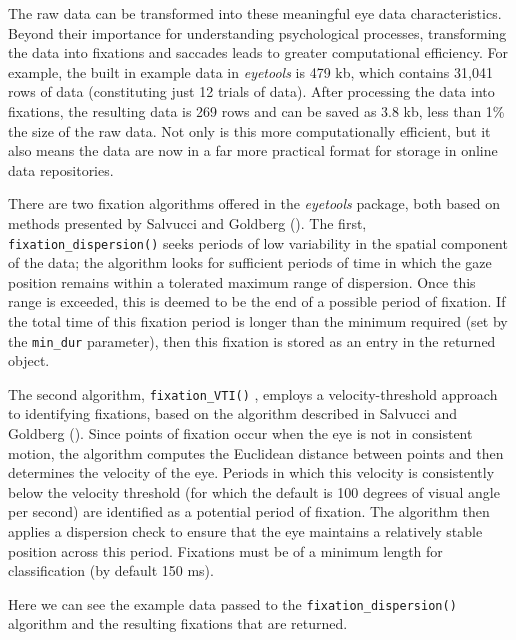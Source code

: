 \documentclass[
  man,
  floatsintext,
  longtable,
  nolmodern,
  notxfonts,
  notimes,
  colorlinks=true,linkcolor=blue,citecolor=blue,urlcolor=blue]{apa7}
\begin{document}
The raw data can be transformed into these meaningful eye data
characteristics. Beyond their importance for understanding psychological
processes, transforming the data into fixations and saccades leads to
greater computational efficiency. For example, the built in example data
in \emph{eyetools} is 479 kb, which contains 31,041 rows of data
(constituting just 12 trials of data). After processing the data into
fixations, the resulting data is 269 rows and can be saved as 3.8 kb,
less than 1\% the size of the raw data. Not only is this more
computationally efficient, but it also means the data are now in a far
more practical format for storage in online data repositories.

There are two fixation algorithms offered in the \emph{eyetools}
package, both based on methods presented by Salvucci and Goldberg
(). The first,
\texttt{fixation\_dispersion()} seeks periods of low variability in the
spatial component of the data; the algorithm looks for sufficient
periods of time in which the gaze position remains within a tolerated
maximum range of dispersion. Once this range is exceeded, this is deemed
to be the end of a possible period of fixation. If the total time of
this fixation period is longer than the minimum required (set by the
\texttt{min\_dur} parameter), then this fixation is stored as an entry
in the returned object.

The second algorithm, \texttt{fixation\_VTI()} , employs a
velocity-threshold approach to identifying fixations, based on the
algorithm described in Salvucci and Goldberg
(). Since points of fixation occur when
the eye is not in consistent motion, the algorithm computes the
Euclidean distance between points and then determines the velocity of
the eye. Periods in which this velocity is consistently below the
velocity threshold (for which the default is 100 degrees of visual angle
per second) are identified as a potential period of fixation. The
algorithm then applies a dispersion check to ensure that the eye
maintains a relatively stable position across this period. Fixations
must be of a minimum length for classification (by default 150 ms).

Here we can see the example data passed to the
\texttt{fixation\_dispersion()} algorithm and the resulting fixations
that are returned.
\end{document}
